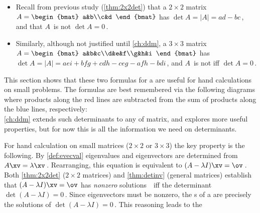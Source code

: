 \begin{itemize}
\item Recall from previous study (\cref{thm:2x2det}) that a \(2\times 2\) matrix \(A=\begin{bmat} a&b\\c&d \end{bmat}\) has  \(\det A=|A|=ad-bc\)\,, and that \(A\)~is not   \(\det A=0\)\,.
\item Similarly, although not justified until \cref{ch:ddm}, a \(3\times 3\) matrix \(A=\begin{bmat} a&b&c\\d&e&f\\g&h&i \end{bmat}\) has  \(\det A=|A|=aei+bfg+cdh-ceg-afh-bdi\)\,, and \(A\)~is not  iff \(\det A=0\)\,.
\end{itemize}
This section shows that these two formulas for a  are useful for hand calculations on small problems.
The formulas are best remembered via the following diagrams where products along the red lines are subtracted from the sum of products along the blue lines, respectively:
\begin{equation}

\label{eq:dets23}
\end{equation}
\cref{ch:ddm} extends such determinants to any  of matrix, and explores more useful properties, but for now this is all the information we need on determinants.


For hand calculation on small matrices (\(2\times 2\) or \(3\times3\)) the key property is the following.
By \cref{def:evecval} eigenvalues and eigenvectors are determined from \(A\xv=\lambda\xv\)\,.  
Rearranging, this equation is equivalent to \((A-\lambda I)\xv=\ov\)\,.  
Both \cref{thm:2x2det} (\(2\times2\) matrices) and \cref{thm:detinv} (general matrices) establish that \((A-\lambda I)\xv=\ov\) has \emph{nonzero} solutions~\xv\ iff the determinant \(\det(A-\lambda I)=0\)\,.
Since eigenvectors must be nonzero, the s of a  are precisely the solutions of \(\det(A-\lambda I)=0\)\,. 
This reasoning leads to the 


